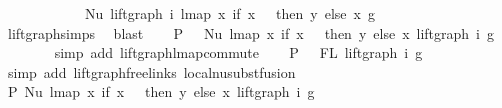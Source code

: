 \begin{isabellebody}
\ \ \ \ \ \ \ \ \ \ \ \ Nu\ {\isacharparenleft}{\kern0pt}lift{\isacharunderscore}{\kern0pt}graph\ i\ {\isacharparenleft}{\kern0pt}lmap\ {\isacharparenleft}{\kern0pt}{\isasymlambda}x{\isachardot}{\kern0pt}\ if\ x\ {\isacharequal}{\kern0pt}\ {}\ then\ y\ else\ x{\isacharparenright}{\kern0pt}\ g{\isacharparenright}{\kern0pt}{\isacharparenright}{\kern0pt}{\isachardoublequoteclose}\isanewline
\ \ \ \ \ \ \isamarkupfalse%
\ lift{\isacharunderscore}{\kern0pt}graph{\isachardot}{\kern0pt}simps{\isacharparenleft}{\kern0pt}{}{\isacharparenright}{\kern0pt}\ \isamarkupfalse%
\ blast\isanewline
\ \ \isamarkupfalse%
\ P{}{\isacharcolon}{\kern0pt}\ {\isachardoublequoteopen}{\isachardot}{\kern0pt}{\isachardot}{\kern0pt}{\isachardot}{\kern0pt}\ {\isacharequal}{\kern0pt}\ Nu\ {\isacharparenleft}{\kern0pt}lmap\ {\isacharparenleft}{\kern0pt}{\isasymlambda}x{\isachardot}{\kern0pt}\ if\ x\ {\isacharequal}{\kern0pt}\ {}\ then\ y\ else\ x{\isacharparenright}{\kern0pt}\ {\isacharparenleft}{\kern0pt}lift{\isacharunderscore}{\kern0pt}graph\ i\ g{\isacharparenright}{\kern0pt}{\isacharparenright}{\kern0pt}{\isachardoublequoteclose}\isanewline
\ \ \ \ \ \ \isamarkupfalse%
\ {\isacharparenleft}{\kern0pt}simp\ add{\isacharcolon}{\kern0pt}\ lift{\isacharunderscore}{\kern0pt}graph{\isacharunderscore}{\kern0pt}lmap{\isacharunderscore}{\kern0pt}commute{\isacharparenright}{\kern0pt}\isanewline
\ \ \isamarkupfalse%
\ P{}{\isacharcolon}{\kern0pt}\ {\isachardoublequoteopen}{}\ {\isasymin}\ FL\ {\isacharparenleft}{\kern0pt}lift{\isacharunderscore}{\kern0pt}graph\ i\ g{\isacharparenright}{\kern0pt}{\isachardoublequoteclose}\isanewline
\ \ \ \ \ \isamarkupfalse%
\ {\isacharparenleft}{\kern0pt}simp\ add{\isacharcolon}{\kern0pt}\ lift{\isacharunderscore}{\kern0pt}graph{\isacharunderscore}{\kern0pt}freelinks\ local{\isachardot}{\kern0pt}nu{\isacharunderscore}{\kern0pt}subst{\isacharunderscore}{\kern0pt}fusion{}{\isacharparenright}{\kern0pt}\isanewline
\ \ \isamarkupfalse%
\ \isamarkupfalse%
\ P{}{\isacharcolon}{\kern0pt}\ {\isachardoublequoteopen}Nu\ {\isacharparenleft}{\kern0pt}lmap\ {\isacharparenleft}{\kern0pt}{\isasymlambda}x{\isachardot}{\kern0pt}\ if\ x\ {\isacharequal}{\kern0pt}\ {}\ then\ y\ else\ x{\isacharparenright}{\kern0pt}\ {\isacharparenleft}{\kern0pt}lift{\isacharunderscore}{\kern0pt}graph\ i\ g{\isacharparenright}{\kern0pt}{\isacharparenright}{\kern0pt}\ {\isasymsimeq}\isanewline

\end{isabellebody}
